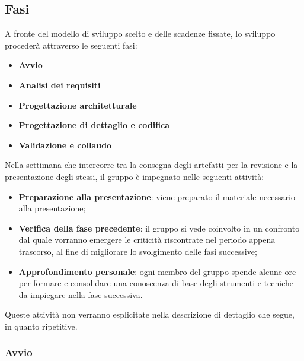 \subsection{Fasi}

A fronte del modello di sviluppo scelto e delle scadenze fissate, lo sviluppo procederà attraverso le seguenti fasi:
\begin{itemize}
	\item \textbf{Avvio}
	\item \textbf{Analisi dei requisiti}
	\item \textbf{Progettazione architetturale}
	\item \textbf{Progettazione di dettaglio e codifica}
	\item \textbf{Validazione e collaudo}
	

\end{itemize}
Nella settimana che intercorre tra la consegna degli artefatti per la revisione e la presentazione degli stessi, il gruppo è impegnato nelle seguenti attività: 
\begin{itemize}
	\item \textbf{Preparazione alla presentazione}: viene preparato il materiale necessario alla presentazione;
	\item \textbf{Verifica della fase precedente}: il gruppo si vede coinvolto in un confronto dal quale vorranno emergere le criticità riscontrate nel periodo appena trascorso, al fine di migliorare lo svolgimento delle fasi successive;
	\item \textbf{Approfondimento personale}: ogni membro del gruppo spende alcune ore per formare e consolidare una conoscenza di base degli strumenti e tecniche da impiegare nella fase successiva.
\end{itemize}
Queste attività non verranno esplicitate nella descrizione di dettaglio che segue, in quanto ripetitive.



\subsubsection{Avvio}

